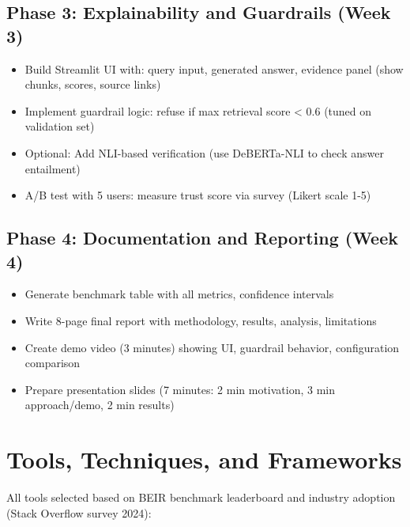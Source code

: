\documentclass[11pt,a4paper]{article}
\begin{document}
\subsection{Phase 3: Explainability and Guardrails (Week 3)}
\begin{itemize}[leftmargin=*,nosep]
    \item Build Streamlit UI with: query input, generated answer, evidence panel (show chunks, scores, source links)
    \item Implement guardrail logic: refuse if max retrieval score < 0.6 (tuned on validation set)
    \item Optional: Add NLI-based verification (use DeBERTa-NLI \cite{he2021deberta} to check answer entailment)
    \item A/B test with 5 users: measure trust score via survey (Likert scale 1-5)
\end{itemize}

\subsection{Phase 4: Documentation and Reporting (Week 4)}
\begin{itemize}[leftmargin=*,nosep]
    \item Generate benchmark table with all metrics, confidence intervals
    \item Write 8-page final report with methodology, results, analysis, limitations
    \item Create demo video (3 minutes) showing UI, guardrail behavior, configuration comparison
    \item Prepare presentation slides (7 minutes: 2 min motivation, 3 min approach/demo, 2 min results)
\end{itemize}

\section{Tools, Techniques, and Frameworks}

All tools selected based on BEIR benchmark leaderboard \cite{thakur2021beir} and industry adoption (Stack Overflow survey 2024):
\end{document}
